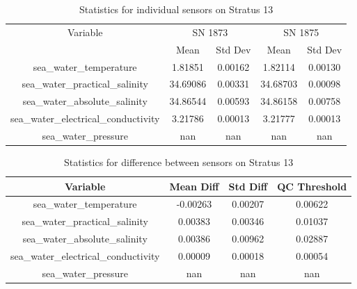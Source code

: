 \begin{table}[h]
\centering
\begin{tabular}{|c|c|c|c|c|}
\hline
Variable & \multicolumn{2}{c|}{SN 1873} & \multicolumn{2}{c|}{SN 1875} \\
& Mean & Std Dev & Mean & Std Dev \\
\hline
sea\_water\_temperature & 1.81851 & 0.00162 & 1.82114 & 0.00130 \\
sea\_water\_practical\_salinity & 34.69086 & 0.00331 & 34.68703 & 0.00098 \\
sea\_water\_absolute\_salinity & 34.86544 & 0.00593 & 34.86158 & 0.00758 \\
sea\_water\_electrical\_conductivity & 3.21786 & 0.00013 & 3.21777 & 0.00013 \\
sea\_water\_pressure & nan & nan & nan & nan \\
\hline
\end{tabular}
\caption{Statistics for individual sensors on Stratus 13}
\end{table}

\begin{table}[h]
\centering
\begin{tabular}{|c|c|c|c|}
\hline
Variable & Mean Diff & Std Diff & QC Threshold \\
\hline
sea\_water\_temperature & -0.00263 & 0.00207 & 0.00622 \\
sea\_water\_practical\_salinity & 0.00383 & 0.00346 & 0.01037 \\
sea\_water\_absolute\_salinity & 0.00386 & 0.00962 & 0.02887 \\
sea\_water\_electrical\_conductivity & 0.00009 & 0.00018 & 0.00054 \\
sea\_water\_pressure & nan & nan & nan \\
\hline
\end{tabular}
\caption{Statistics for difference between sensors on Stratus 13}
\end{table}
